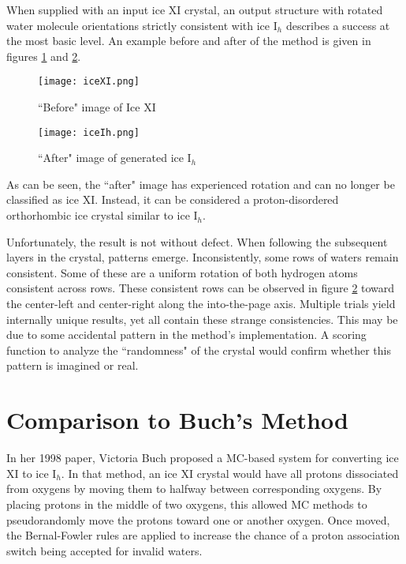 When supplied with an input ice XI crystal, an output structure with rotated water molecule orientations strictly consistent with ice I$_{h}$ describes a success at the most basic level.
An example before and after of the method is given in figures \ref{fig:iceXI} and \ref{fig:iceIh}.
\begin{figure}
	
	\centering
	
	\texttt{[image: iceXI.png]}
	
	\caption{``Before" image of Ice XI}
	
	\label{fig:iceXI}
	
\end{figure}
\begin{figure}
	
	\centering
	
	\texttt{[image: iceIh.png]}
	
	\caption{``After" image of generated ice I$_{h}$}
	
	\label{fig:iceIh}
	
\end{figure}
As can be seen, the ``after" image has experienced rotation and can no longer be classified as ice XI. 
Instead, it can be considered a proton-disordered orthorhombic ice crystal similar to ice I$_{h}$. 

Unfortunately, the result is not without defect.
When following the subsequent layers in the crystal, patterns emerge. 
Inconsistently, some rows of waters remain consistent.
Some of these are a uniform rotation of both hydrogen atoms consistent across rows.
These consistent rows can be observed in figure \ref{fig:iceIh} toward the center-left and center-right along the into-the-page axis.
Multiple trials yield internally unique results, yet all contain these strange consistencies.
This may be due to some accidental pattern in the method's implementation.
A scoring function to analyze the ``randomness" of the crystal would confirm whether this pattern is imagined or real.

%
%
%
%
\section{Comparison to Buch's Method}

In her 1998 paper, Victoria Buch proposed a MC-based system for converting ice XI to ice I$_{h}$.\cite{MCIce} 
In that method, an ice XI crystal would have all protons dissociated from oxygens by moving them to halfway between corresponding oxygens.
By placing protons in the middle of two oxygens, this allowed MC methods to pseudorandomly move the protons toward one or another oxygen.
Once moved, the Bernal-Fowler rules are applied to increase the chance of a proton association switch being accepted for invalid waters.

